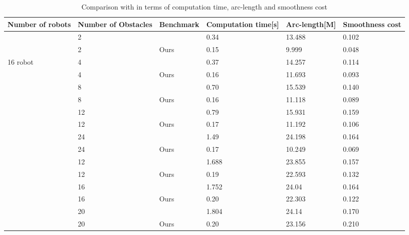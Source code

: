 \begin{table}
\centering
\caption{ Comparison with \citep{aks_ral21} in terms of computation time, arc-length and smoothness cost }
\label{table_3}
\scriptsize
\begin{tabular}{|p{2cm}|p{2.5cm}|p{3.5cm}|p{2cm}|p{2cm}|p{2cm}|}
\hline
Number of robots & Number of Obstacles &Benchmark & Computation time[s] & Arc-length[M] & Smoothness cost  \\ 
\hline
 \multirow{2}{*}{}&2  & \citep{aks_ral21}  &  0.34 & 13.488 & 0.102\\  
 \cline{2-6} 
 \multirow{2}{*}{}&2  & Ours &  0.15  &  9.999 & 0.048\\  
 \cline{2-6}
 \multirow{2}{*}{16 robot}& 4 & \citep{aks_ral21} & 0.37 & 14.257& 0.114\\
 \cline{2-6}
  \multirow{2}{*}{}& 4 & Ours  & 0.16 & 11.693& 0.093\\
 \cline{2-6}
 \multirow{2}{*}{}&8 & \citep{aks_ral21} & 0.70 &15.539 & 0.140\\
 \cline{2-6}
  \multirow{2}{*}{}&8 & Ours & 0.16 &11.118 & 0.089\\
 \cline{2-6}
 \multirow{2}{*}{}&12 & \citep{aks_ral21}  & 0.79 & 15.931 & 0.159\\
  \cline{2-6}
\multirow{2}{*}{} & 12  & Ours & 0.17 & 11.192 & 0.106\\ 
\cline{2-6}
 \multirow{2}{*}{}&24 & \citep{aks_ral21}  &1.49  & 24.198 & 0.164\\
  \cline{2-6}
\multirow{2}{*}{} & 24  & Ours & 0.17 & 10.249 & 0.069\\ 
\hline \hline
\multirow{2}{*}{} & 12  & \citep{aks_ral21} & 1.688 & 23.855  &0.157\\
\cline{2-6}
\multirow{2}{*}{} & 12  & Ours & 0.19 & 22.593 & 0.132\\
\cline{2-6}
\multirow{2}{*}{} & 16  & \citep{aks_ral21} & 1.752 &24.04 &0.164\\
\cline{2-6}
\multirow{2}{*}{32 robots} & 16  & Ours & 0.20 & 22.303 &0.122 \\
\cline{2-6}
\multirow{2}{*}{} & 20 & \citep{aks_ral21} & 1.804  &24.14 &0.170\\
\cline{2-6}
\multirow{2}{*}{} & 20  & Ours & 0.20 & 23.156 &0.210 \\
\cline{2-6}
\hline
\end{tabular}
\normalsize
\end{table}



